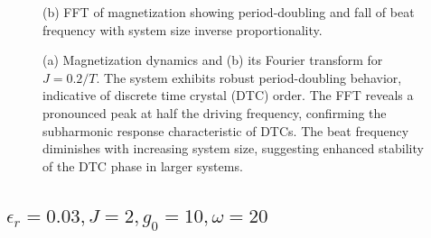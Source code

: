 \documentclass[a4paper, 11pt]{article}
\begin{document}
\begin{figure}[h!]
\begin{minipage}[t]{0.48\textwidth}
        \caption*{(b) FFT of magnetization showing period-doubling and fall of beat frequency with system size inverse proportionality.}
    \end{minipage}
    \caption{(a) Magnetization dynamics and (b) its Fourier transform for $J = 0.2/T$. The system exhibits robust period-doubling behavior, indicative of discrete time crystal (DTC) order. The FFT reveals a pronounced peak at half the driving frequency, confirming the subharmonic response characteristic of DTCs. The beat frequency diminishes with increasing system size, suggesting enhanced stability of the DTC phase in larger systems.}
\end{figure}
\newpage
\subsection{$\epsilon_r = 0.03, J = 2, g_0 = 10, \omega = 20$}
\end{document}
